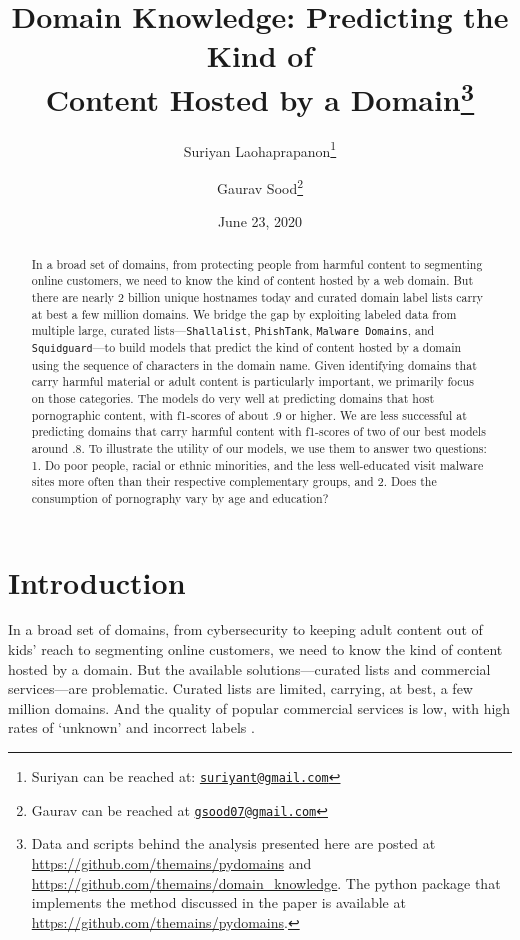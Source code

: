 \documentclass[12pt, letterpaper]{article}
\title{\Large{Domain Knowledge: Predicting the Kind of\\Content Hosted by a Domain}\footnote{Data and scripts behind the analysis presented here are posted at \url{https://github.com/themains/pydomains} and \url{https://github.com/themains/domain_knowledge}. The python package that implements the method discussed in the paper is available at \url{https://github.com/themains/pydomains}.}}
\author{Suriyan Laohaprapanon\thanks{Suriyan can be reached at: \href{mailto:suriyant@gmail.com}{\footnotesize{\texttt{suriyant@gmail.com}}}}\vspace{.5cm} \and Gaurav Sood\thanks{Gaurav can be reached at \href{mailto:gsood07@gmail.com}{\footnotesize{\texttt{gsood07@gmail.com}}}}}
\date{June 23, 2020}
\begin{document}
\maketitle

\begin{abstract}

In a broad set of domains, from protecting people from harmful content to segmenting online customers, we need to know the kind of content hosted by a web domain. But there are nearly 2 billion unique hostnames today and curated domain label lists carry at best a few million domains. We bridge the gap by exploiting labeled data from multiple large, curated lists---\texttt{Shallalist}, \texttt{PhishTank}, \texttt{Malware Domains}, and \texttt{Squidguard}---to build models that predict the kind of content hosted by a domain using the sequence of characters in the domain name. Given identifying domains that carry harmful material or adult content is particularly important, we primarily focus on those categories. The models do very well at predicting domains that host pornographic content, with f1-scores of about .9 or higher. We are less successful at predicting domains that carry harmful content with f1-scores of two of our best models around .8. To illustrate the utility of our models, we use them to answer two questions: 1. Do poor people, racial or ethnic minorities, and the less well-educated visit malware sites more often than their respective complementary groups, and 2. Does the consumption of pornography vary by age and education?

\end{abstract}
\doublespace
\section{Introduction}
In a broad set of domains, from cybersecurity to keeping adult content out of kids' reach to segmenting online customers, we need to know the kind of content hosted by a domain.  But the available solutions---curated lists and commercial services---are problematic. Curated lists are limited, carrying, at best, a few million domains. And the quality of popular commercial services is low, with high rates of `unknown' and incorrect labels \citep{deri2015implementing}.
\end{document}
